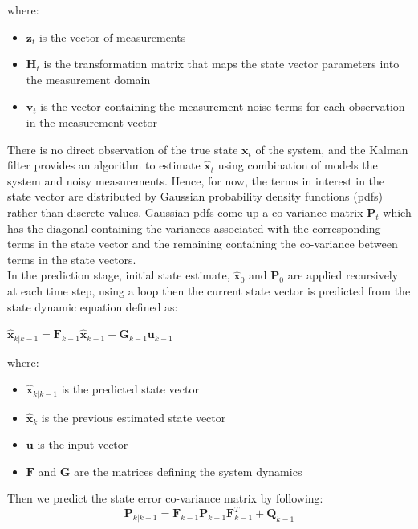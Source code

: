 where:
\begin{itemize}
    \item $\textbf{z}_t$ is the vector of measurements
    \item $\textbf{H}_t$ is the transformation matrix that maps the state vector parameters into the measurement domain
    \item $\textbf{v}_t$ is the vector containing the measurement noise terms for each observation in the measurement vector
\end{itemize}
There is no direct observation of the true state $\textbf{x}_t$ of the system, and the Kalman filter provides an algorithm to estimate $\hat{\textbf{x}}_t$ using combination of models the system and noisy measurements. Hence, for now, the terms in interest in the state vector are distributed by Gaussian probability density functions (pdfs) rather than discrete values. Gaussian pdfs come up a co-variance matrix $\textbf{P}_t$ which has the diagonal containing the variances associated with the corresponding terms in the state vector and the remaining containing the co-variance between terms in the state vectors.\\
In the prediction stage, initial state estimate, $\hat{\textbf{x}}_0$ and $\textbf{P}_0$ are applied recursively at each time step, using a loop then the current state vector is predicted from the state dynamic equation defined as:
\begin{center}
    $
        \hat{\textbf{x}}_{k|k-1} = \textbf{F}_{k-1}\hat{\textbf{x}}_{k-1} + \textbf{G}_{k-1}\textbf{u}_{k-1}
    $
\end{center}
where:
\begin{itemize}
    \item $\hat{\textbf{x}}_{k|k-1}$ is the predicted state vector
    \item $\hat{\textbf{x}}_{k}$ is the previous estimated state vector
    \item $\textbf{u}$ is the input vector
    \item $\textbf{F}$ and $\textbf{G}$ are the matrices defining the system dynamics
\end{itemize}
\pagebreak
Then we predict the state error co-variance matrix by following:
\begin{displaymath}
          \textbf{P}_{k|k-1} = \textbf{F}_{k-1}\textbf{P}_{k-1}\textbf{F}^T_{k-1} + \textbf{Q}_{k-1}
\end{displaymath}

